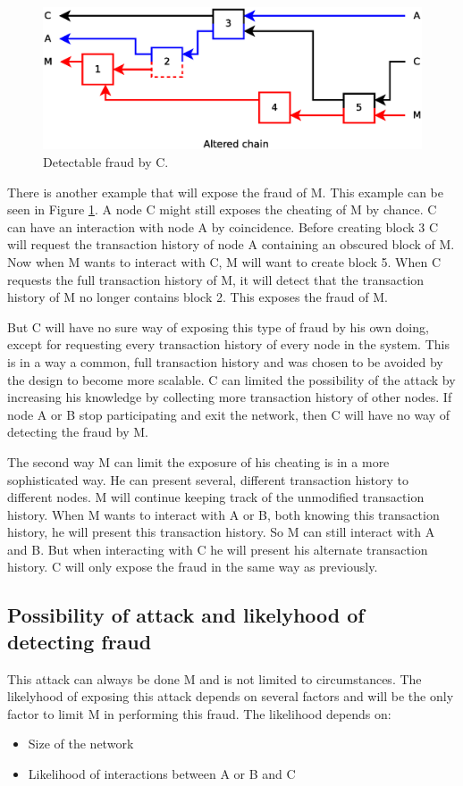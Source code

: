 \begin{figure}
	\centerline{\includegraphics[scale=0.3]{problems/figs/branch-fraud-detected.eps}}
	\caption{Detectable fraud by C.}
	\label{fig:problem-branch-preknowledge}
\end{figure}

There is another example that will expose the fraud of M.
This example can be seen in Figure \ref{fig:problem-branch-preknowledge}.
A node C might still exposes the cheating of M by chance.
C can have an interaction with node A by coincidence.
Before creating block 3 C will request the transaction history of node A containing an obscured block of M.
Now when M wants to interact with C, M will want to create block 5.
When C requests the full transaction history of M, it will detect that the transaction history of M no longer contains block 2.
This exposes the fraud of M.

But C will have no sure way of exposing this type of fraud by his own doing,
except for requesting every transaction history of every node in the system.
This is in a way a common, full transaction history and was chosen to be avoided by the design to become more scalable.
C can limited the possibility of the attack by increasing his knowledge by collecting more transaction history of other nodes.
If node A or B stop participating and exit the network,
then C will have no way of detecting the fraud by M.

The second way M can limit the exposure of his cheating is in a more sophisticated way.
He can present several, different transaction history to different nodes.
M will continue keeping track of the unmodified transaction history.
When M wants to interact with A or B, both knowing this transaction history, he will present this transaction history.
So M can still interact with A and B.
But when interacting with C he will present his alternate transaction history.
C will only expose the fraud in the same way as previously.

\subsection{Possibility of attack and likelyhood of detecting fraud}
This attack can always be done M and is not limited to circumstances.
The likelyhood of exposing this attack depends on several factors
and will be the only factor to limit M in performing this fraud.
The likelihood depends on:
\begin{itemize}
\item Size of the network
\item Likelihood of interactions between A or B and C
\end{itemize}

